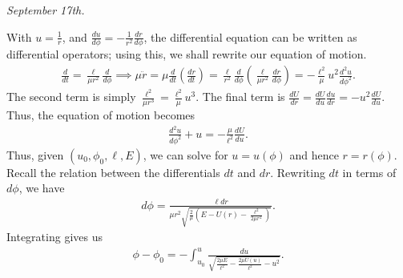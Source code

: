 \noindent\textit{September 17th.}

With $u = \frac{1}{r}$, and $\frac{du}{d\phi} = -\frac{1}{r^{2}} \frac{dr}{d\phi}$, the differential equation can be written as differential operators; using this, we shall rewrite our equation of motion.
\begin{align}
    \frac{d}{dt} = \frac{\ell}{\mu r^{2}} \frac{d}{d\phi} \implies \mu \ddot{r} = \mu \frac{d}{dt}\left( \frac{dr}{dt} \right) = \frac{\ell}{r^{2}} \frac{d}{d\phi}\left( \frac{\ell}{\mu r^{2}} \frac{dr}{d\phi} \right) = -\frac{\ell^{2}}{\mu} u^{2} \frac{d^{2}u}{d\phi^{2}}.
\end{align}
The second term is simply $\frac{\ell^{2}}{\mu r^{3}} = \frac{\ell^{2}}{\mu} u^{3}$. The final term is $\frac{dU}{dr} = \frac{dU}{du} \frac{du}{dr} = -u^{2} \frac{dU}{du}$. Thus, the equation of motion becomes
\begin{align}
    \frac{d^{2}u}{d\phi^{2}} + u = -\frac{\mu}{\ell^{2}} \frac{dU}{du}.
\end{align}
Thus, given $(u_{0},\phi_{0},\ell,E)$, we can solve for $u = u(\phi)$ and hence $r = r(\phi)$. Recall the relation between the differentials $dt$ and $dr$. Rewriting $dt$ in terms of $d\phi$, we have
\begin{align}
    d\phi = \frac{\ell dr}{\mu r^{2} \sqrt{\frac{2}{\mu} \left( E-U(r) - \frac{\ell^{2}}{2\mu r^{2}} \right)}}.
\end{align}
Integrating gives us
\begin{align}
    \phi - \phi_{0} = -\int_{u_{0}}^{u} \frac{du}{\sqrt{\frac{2\mu E}{\ell^{2}} - \frac{2\mu U(u)}{\ell^{2}} -u^{2}}}.
\end{align}

